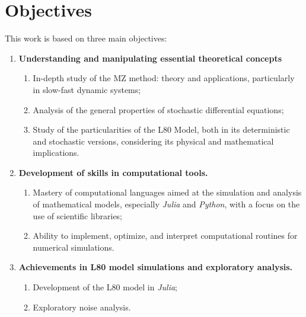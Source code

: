 \documentclass[12pt]{article}
\begin{document}
\section*{Objectives}
This work is based on three main objectives:
\begin{enumerate}
	\item \textbf{Understanding and manipulating essential theoretical concepts}
	      \begin{enumerate}
	      	\item In-depth study of the MZ method: theory and applications, particularly in slow-fast dynamic systems;
	      	                  
	      	\item Analysis of the general properties of stochastic differential equations;
	      	\item Study of the particularities of the L80 Model, both in its deterministic and stochastic versions, considering its physical and mathematical implications.
	      \end{enumerate}
	\item \textbf{Development of skills in computational tools.}
	                
	      \begin{enumerate}
	      	\item Mastery of computational languages aimed at the simulation and analysis of mathematical models, especially \textit{Julia} and \textit{Python}, with a focus on the use of scientific libraries;
	      	\item Ability to implement, optimize, and interpret computational routines for numerical simulations.
	      	                
	      \end{enumerate}
	                
	\item \textbf{Achievements in L80 model simulations and exploratory analysis.}
	      \begin{enumerate}
	      	\item Development of the L80 model in \textit{Julia};
	      	\item Exploratory noise analysis.
	      \end{enumerate}
\end{enumerate}
\end{document}
